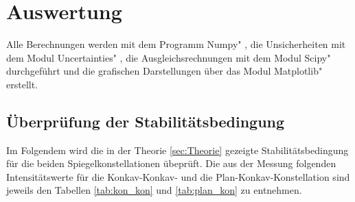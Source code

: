\section{Auswertung}
\label{sec:Auswertung}
Alle Berechnungen werden mit dem Programm \glqq Numpy" \cite{numpy}, die Unsicherheiten mit dem Modul \glqq Uncertainties" \cite{uncertainties}, die Ausgleichsrechnungen mit dem Modul \glqq Scipy" \cite{scipy} durchgeführt und die grafischen Darstellungen über das Modul \glqq Matplotlib" \cite{matplotlib} erstellt.

\subsection{Überprüfung der Stabilitätsbedingung}

Im Folgendem wird die in der Theorie \ref{sec:Theorie} gezeigte Stabilitätsbedingung für die beiden Spiegelkonstellationen übeprüft.
Die aus der Messung folgenden Intensitätswerte für die Konkav-Konkav- und die Plan-Konkav-Konstellation sind jeweils den Tabellen \ref{tab:kon_kon} und \ref{tab:plan_kon} zu entnehmen.
 



%
